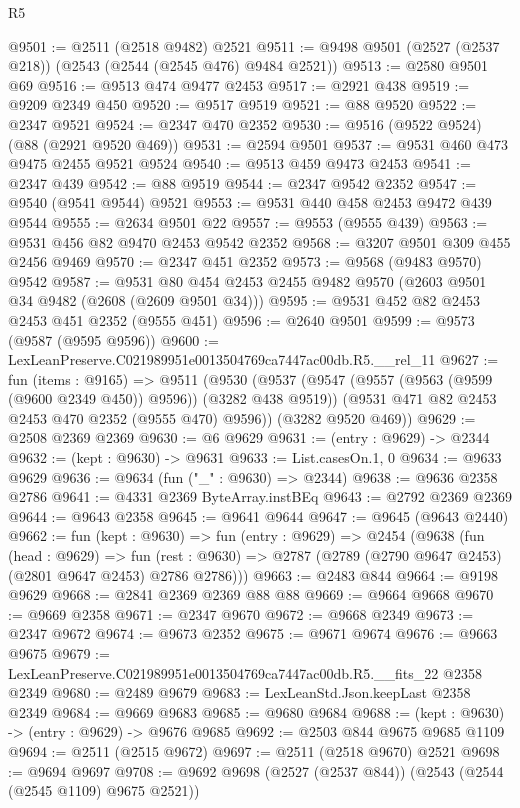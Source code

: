 \begin{lexlean}{R5}
\begin{coremodule}
@9501 := @2511 (@2518 @9482) @2521
@9511 := @9498 @9501 (@2527 (@2537 @218)) (@2543 (@2544 (@2545 @476) @9484 @2521))
@9513 := @2580 @9501 @69
@9516 := @9513 @474 @9477 @2453
@9517 := @2921 @438
@9519 := @9209 @2349 @450
@9520 := @9517 @9519
@9521 := @88 @9520
@9522 := @2347 @9521
@9524 := @2347 @470 @2352
@9530 := @9516 (@9522 @9524) (@88 (@2921 @9520 @469))
@9531 := @2594 @9501
@9537 := @9531 @460 @473 @9475 @2455 @9521 @9524
@9540 := @9513 @459 @9473 @2453
@9541 := @2347 @439
@9542 := @88 @9519
@9544 := @2347 @9542 @2352
@9547 := @9540 (@9541 @9544) @9521
@9553 := @9531 @440 @458 @2453 @9472 @439 @9544
@9555 := @2634 @9501 @22
@9557 := @9553 (@9555 @439)
@9563 := @9531 @456 @82 @9470 @2453 @9542 @2352
@9568 := @3207 @9501 @309 @455 @2456 @9469
@9570 := @2347 @451 @2352
@9573 := @9568 (@9483 @9570) @9542
@9587 := @9531 @80 @454 @2453 @2455 @9482 @9570 (@2603 @9501 @34 @9482 (@2608 (@2609 @9501 @34)))
@9595 := @9531 @452 @82 @2453 @2453 @451 @2352 (@9555 @451)
@9596 := @2640 @9501
@9599 := @9573 (@9587 (@9595 @9596))
@9600 := LexLeanPreserve.C021989951e0013504769ca7447ac00db.R5.__rel_11
@9627 := fun (items : @9165) =>
  @9511
    (@9530
      (@9537
        (@9547 (@9557 (@9563 (@9599 (@9600 @2349 @450)) @9596)) (@3282 @438 @9519))
        (@9531 @471 @82 @2453 @2453 @470 @2352 (@9555 @470) @9596))
      (@3282 @9520 @469))
@9629 := @2508 @2369 @2369
@9630 := @6 @9629
@9631 := (entry : @9629) -> @2344
@9632 := (kept : @9630) -> @9631
@9633 := List.casesOn.{1, 0}
@9634 := @9633 @9629
@9636 := @9634 (fun ("_" : @9630) => @2344)
@9638 := @9636 @2358 @2786
@9641 := @4331 @2369 ByteArray.instBEq
@9643 := @2792 @2369 @2369
@9644 := @9643 @2358
@9645 := @9641 @9644
@9647 := @9645 (@9643 @2440)
@9662 := fun (kept : @9630) =>
  fun (entry : @9629) =>
  @2454
    (@9638
      (fun (head : @9629) =>
      fun (rest : @9630) => @2787 (@2789 (@2790 @9647 @2453) (@2801 @9647 @2453) @2786 @2786)))
@9663 := @2483 @844
@9664 := @9198 @9629
@9668 := @2841 @2369 @2369 @88 @88
@9669 := @9664 @9668
@9670 := @9669 @2358
@9671 := @2347 @9670
@9672 := @9668 @2349
@9673 := @2347 @9672
@9674 := @9673 @2352
@9675 := @9671 @9674
@9676 := @9663 @9675
@9679 := LexLeanPreserve.C021989951e0013504769ca7447ac00db.R5.__fits_22 @2358 @2349
@9680 := @2489 @9679
@9683 := LexLeanStd.Json.keepLast @2358 @2349
@9684 := @9669 @9683
@9685 := @9680 @9684
@9688 := (kept : @9630) -> (entry : @9629) -> @9676 @9685
@9692 := @2503 @844 @9675 @9685 @1109
@9694 := @2511 (@2515 @9672)
@9697 := @2511 (@2518 @9670) @2521
@9698 := @9694 @9697
@9708 := @9692 @9698 (@2527 (@2537 @844)) (@2543 (@2544 (@2545 @1109) @9675 @2521))

\end{coremodule}
\end{lexlean}
